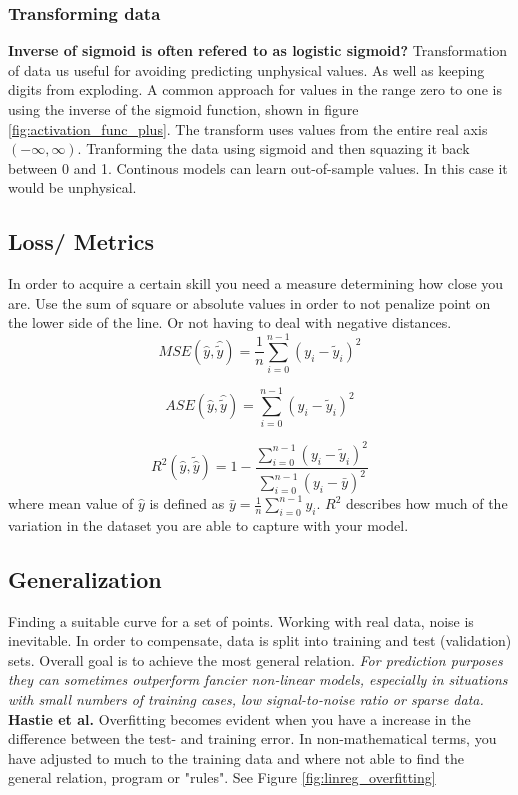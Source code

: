\documentclass{article}
\begin{document}
\subsubsection{Transforming data} \label{sec:transforming_cloud_cover}
\textbf{Inverse of sigmoid is often refered to as logistic sigmoid?}
Transformation of data us useful for avoiding predicting unphysical values. As well as keeping digits from exploding.
A common approach for values in the range zero to one is using the inverse of the sigmoid function, shown in figure \ref{fig:activation_func_plus}. The transform uses values from the entire real axis $(-\infty, \infty)$. 
%
Tranforming the data using sigmoid and then squazing it back between 0 and 1. 
Continous models can learn out-of-sample values. In this case it would be unphysical.

\subsection{Loss/ Metrics}  \label{sec:metrics}
In order to acquire a certain skill you need a measure determining how close you are. 
Use the sum of square or absolute values in order to not penalize point on the lower side of the line. Or not having to deal with negative distances. 
\begin{equation} \label{eq:mse}
    MSE(\hat{y},\hat{\tilde{y}}) = \frac{1}{n} \sum_{i=0}^{n-1}(y_i-\tilde{y}_i)^2
\end{equation} 

\begin{equation} \label{eq:ase}
    ASE(\hat{y},\hat{\tilde{y}}) =  \sum_{i=0}^{n-1}(y_i-\tilde{y}_i)^2
\end{equation} 

\begin{equation} \label{eq:r2}
    R^2(\hat{y}, \tilde{\hat{y}}) = 1 - \frac{\sum_{i=0}^{n - 1} (y_i - \tilde{y}_i)^2}{\sum_{i=0}^{n - 1} (y_i - \bar{y})^2}
\end{equation} 
where mean value of $\hat{y}$ is defined as $\bar{y} =  \frac{1}{n} \sum_{i=0}^{n - 1} y_i$. $R^2$ describes how much of the variation in the dataset you are able to capture with your model.

\subsection{Generalization} \label{sec:generalization}
Finding a suitable curve for a set of points. Working with real data, noise is inevitable. In order to compensate, data is split into training and test (validation) sets. %
Overall goal is to achieve the most general relation. \textit{For prediction purposes they can sometimes outperform fancier non-linear models, especially in situations with small numbers of training cases, low signal-to-noise ratio or sparse data.} \textbf{Hastie et al.} Overfitting becomes evident when you have a increase in the difference between the test- and training error. In non-mathematical terms, you have adjusted to much to the training data and where not able to find the general relation, program or "rules". See Figure \ref{fig:linreg_overfitting} 
\end{document}
